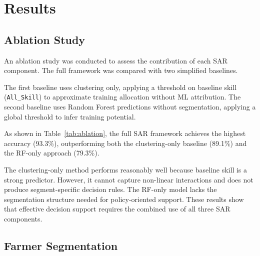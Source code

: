 \documentclass[3p,twocolumn,authoryear]{elsarticle}
\begin{document}
\section{Results}

\subsection{Ablation Study}

An ablation study was conducted to assess the contribution of each SAR
component. The full framework was compared with two simplified baselines.

The first baseline uses clustering only, applying a threshold on baseline skill
(\texttt{All\_Skill}) to approximate training allocation without ML attribution.
The second baseline uses Random Forest predictions without segmentation,
applying a global threshold to infer training potential.

As shown in Table~\ref{tab:ablation}, the full SAR framework achieves the
highest accuracy (93.3\%), outperforming both the clustering-only baseline
(89.1\%) and the RF-only approach (79.3\%).

The clustering-only method performs reasonably well because baseline skill is a
strong predictor. However, it cannot capture non-linear interactions and does
not produce segment-specific decision rules. The RF-only model lacks the
segmentation structure needed for policy-oriented support. These results show
that effective decision support requires the combined use of all three SAR
components.

\begin{table}[htbp]
\centering
\caption{Ablation study: SAR versus baseline methods.}
\label{tab:ablation}
\end{table}

\subsection{Farmer Segmentation}
\end{document}
